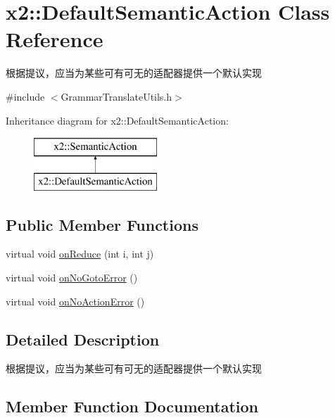 \hypertarget{classx2_1_1_default_semantic_action}{}\section{x2\+:\+:Default\+Semantic\+Action Class Reference}
\label{classx2_1_1_default_semantic_action}


根据提议，应当为某些可有可无的适配器提供一个默认实现  




{\ttfamily \#include $<$Grammar\+Translate\+Utils.\+h$>$}

Inheritance diagram for x2\+:\+:Default\+Semantic\+Action\+:\begin{figure}[H]
\begin{center}
\leavevmode
\includegraphics[height=2.000000cm]{classx2_1_1_default_semantic_action}
\end{center}
\end{figure}
\subsection*{Public Member Functions}
\begin{DoxyCompactItemize}
\item 
virtual void \hyperlink{classx2_1_1_default_semantic_action_a25f6cc0ccc04c61ad57bfcf10b9c0cb9}{on\+Reduce} (int i, int j)
\item 
virtual void \hyperlink{classx2_1_1_default_semantic_action_acbd05d5f08396b9df966494bd4422a54}{on\+No\+Goto\+Error} ()
\item 
virtual void \hyperlink{classx2_1_1_default_semantic_action_a6485fcbff1d9b9d63d40112d8887790d}{on\+No\+Action\+Error} ()
\end{DoxyCompactItemize}


\subsection{Detailed Description}
根据提议，应当为某些可有可无的适配器提供一个默认实现 

\subsection{Member Function Documentation}
\mbox{\label{classx2_1_1_default_semantic_action_a6485fcbff1d9b9d63d40112d8887790d}} 
